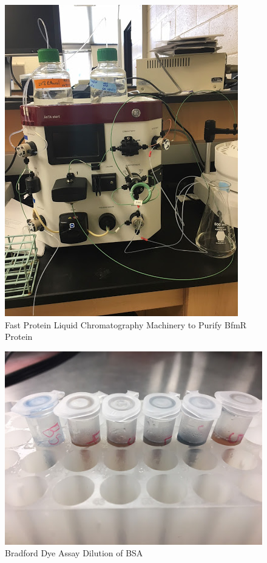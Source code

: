 \documentclass[11pt]{article}
\begin{document}
\begin{figure}[htbp]
\centering
\includegraphics[scale=0.5]{chromatographic-machinery.jpg}
\caption{Fast Protein Liquid Chromatography Machinery to Purify BfmR Protein}
\label{fig:chromatography-machinery}
\end{figure}

\begin{figure}[htbp]
\centering
\includegraphics[scale=0.5]{dilution-bsa.jpg}
\caption{Bradford Dye Assay Dilution of BSA}
\label{fig:dilution-bsa}
\end{figure}
\end{document}
